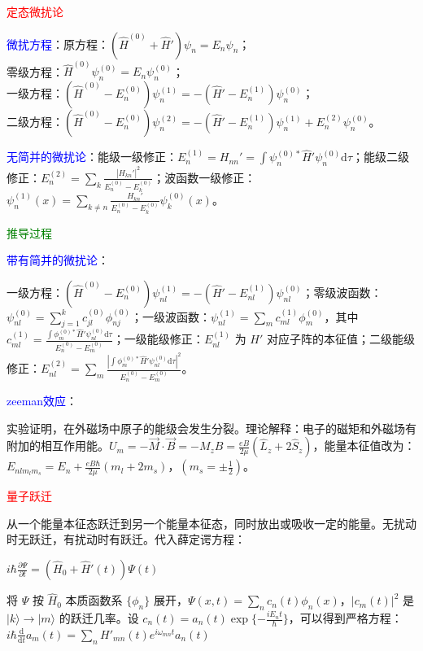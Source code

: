 \documentclass[a4paper,8pt]{extarticle} %
\newcommand{\bluetext}[1]{\textcolor{blue}{#1}}
\newcommand{\redtext}[1]{\textcolor{red}{#1}}
\newcommand{\greentext}[1]{\textcolor{green}{#1}}
\begin{document}
\begin{multicols}{3}
\setlength{\columnsep}{0.1cm} 

\redtext{定态微扰论}

\bluetext{微扰方程}：原方程：$(\hat{H}^{(0)} + \hat{H}')\psi_n = E_n\psi_n$；\\
零级方程：$\hat{H}^{(0)}\psi_n^{(0)} = E_n\psi_n^{(0)}$；\\
一级方程：$(\hat{H}^{(0)} - E_n^{(0)})\psi_n^{(1)} = -(\hat{H}' - E_n^{(1)})\psi_n^{(0)}$；\\
二级方程：$(\hat{H}^{(0)} - E_n^{(0)})\psi_n^{(2)} = -(\hat{H}' - E_n^{(1)})\psi_n^{(1)} + E_n^{(2)}\psi_n^{(0)}$。

\bluetext{无简并的微扰论}：能级一级修正：$E_n^{(1)} = H_{nn}' = \int \psi_n^{(0)*} \hat{H}'\psi_n^{(0)} \mathrm{d}\tau$；能级二级修正：$E_n^{(2)} = \sum_k \frac{|H_{kn}'|^2}{E_n^{(0)}-E_k^{(0)}}$；波函数一级修正：$\psi_n^{(1)}(x) = \sum_{k\neq n} \frac{H_{kn}'}{E_n^{(0)}-E_k^{(0)}} \psi_k^{(0)}(x)$。

\greentext{推导过程}

\bluetext{带有简并的微扰论}：

一级方程：$(\hat{H}^{(0)} - E_n^{(0)})\psi_{nl}^{(1)} = -(\hat{H}' - E_{nl}^{(1)})\psi_{nl}^{(0)}$；零级波函数：$\psi_{nl}^{(0)} = \sum_{j=1}^k c_{jl}^{(0)} \phi_{nj}^{(0)}$；一级波函数：$\psi_{nl}^{(1)} = \sum_m c_{ml}^{(1)}\phi_m^{(0)}$，其中 $c_{ml}^{(1)} = \frac{\int \phi_m^{(0)*} \hat{H}' \psi_{nl}^{(0)} \mathrm{d}\tau}{E_n^{(0)}-E_m^{(0)}}$；一级能级修正：$E_{nl}^{(1)}$ 为 $H'$ 对应子阵的本征值；二级能级修正：$E_{nl}^{(2)} = \sum_m \frac{|\int \phi_m^{(0)*} \hat{H}' \psi_{nl}^{(0)} \mathrm{d}\tau|^2}{E_n^{(0)}-E_m^{(0)}}$。

\bluetext{zeeman效应}：

实验证明，在外磁场中原子的能级会发生分裂。理论解释：电子的磁矩和外磁场有附加的相互作用能。$U_m = -\vec{M}\cdot\vec{B} = -M_z B = \frac{eB}{2\mu}(\hat{L}_z + 2\hat{S}_z)$，能量本征值改为：$E_{nlm_l m_s} = E_n + \frac{eB\hbar}{2\mu}(m_l + 2m_s)$，$(m_s = \pm\frac{1}{2})$。

\redtext{量子跃迁}

从一个能量本征态跃迁到另一个能量本征态，同时放出或吸收一定的能量。无扰动时无跃迁，有扰动时有跃迁。代入薛定谔方程：

$i\hbar\frac{\partial\Psi}{\partial t} = (\hat{H}_0 + \hat{H}'(t))\Psi(t)$

将 $\Psi$ 按 $\hat{H}_0$ 本质函数系 $\{\phi_n\}$ 展开，$\Psi(x,t) = \sum_n c_n(t)\phi_n(x)$，$|c_m(t)|^2$ 是 $|k\rangle \to |m\rangle$ 的跃迁几率。设 $c_n(t) = a_n(t)\exp\{-\frac{iE_n t}{\hbar}\}$，可以得到严格方程：
$i\hbar\frac{\mathrm{d}}{\mathrm{d}t}a_m(t) = \sum_n H'_{mn}(t)e^{i\omega_{mn}t}a_n(t)$


\end{multicols}
\end{document}
